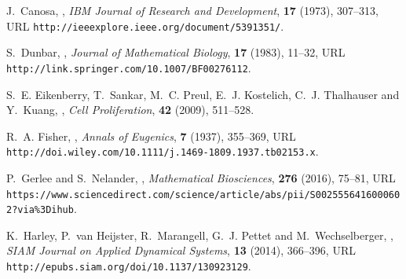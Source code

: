 \documentclass{aims}
\numberwithin{equation}{section}
\begin{document}

%
%

\providecommand{\href}[2]{#2}
\providecommand{\arxiv}[1]{\href{http://arxiv.org/abs/#1}{arXiv:#1}}
\providecommand{\url}[1]{\texttt{#1}}
\providecommand{\urlprefix}{URL }
\begin{thebibliography}{10}

\newblock J.~Canosa,
,
\newblock \emph{IBM Journal of Research and Development}, \textbf{17} (1973),
  307--313,
\newblock \urlprefix\url{http://ieeexplore.ieee.org/document/5391351/}.

\newblock S.~Dunbar,
,
\newblock \emph{Journal of Mathematical Biology}, \textbf{17} (1983), 11--32,
\newblock \urlprefix\url{http://link.springer.com/10.1007/BF00276112}.

\newblock S.~E. Eikenberry, T.~Sankar, M.~C. Preul, E.~J. Kostelich, C.~J.
  Thalhauser and Y.~Kuang,
,
\newblock \emph{Cell Proliferation}, \textbf{42} (2009), 511--528.

\newblock R.~A. Fisher,
,
\newblock \emph{Annals of Eugenics}, \textbf{7} (1937), 355--369,
\newblock
  \urlprefix\url{http://doi.wiley.com/10.1111/j.1469-1809.1937.tb02153.x}.

\newblock P.~Gerlee and S.~Nelander,
,
\newblock \emph{Mathematical Biosciences}, \textbf{276} (2016), 75--81,
\newblock
  \urlprefix\url{https://www.sciencedirect.com/science/article/abs/pii/S0025556416000602?via{\%}3Dihub}.

\newblock K.~Harley, P.~van Heijster, R.~Marangell, G.~J. Pettet and
  M.~Wechselberger,
,
\newblock \emph{SIAM Journal on Applied Dynamical Systems}, \textbf{13} (2014),
  366--396,
\newblock \urlprefix\url{http://epubs.siam.org/doi/10.1137/130923129}.


\end{thebibliography}
\end{document}
